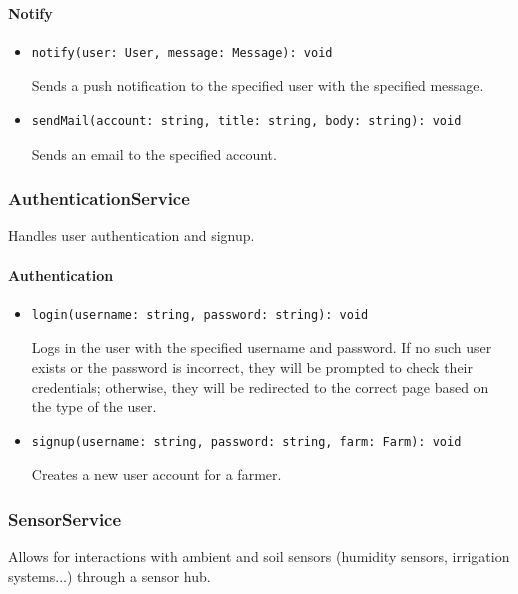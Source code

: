 \documentclass{article}
\begin{document}
\paragraph{Notify}
\begin{itemize}
\item \begin{verbatim}
notify(user: User, message: Message): void
\end{verbatim}
Sends a push notification to the specified user with the specified message.
\item \begin{verbatim}
sendMail(account: string, title: string, body: string): void
\end{verbatim}
Sends an email to the specified account.
\end{itemize}

\subsubsection{AuthenticationService}
Handles user authentication and signup.

\paragraph{Authentication}
\begin{itemize}
\item \begin{verbatim}
login(username: string, password: string): void
\end{verbatim}
Logs in the user with the specified username and password.
If no such user exists or the password is incorrect, they will be prompted to check their credentials; otherwise, they will be redirected to the correct page based on the type of the user.
\item \begin{verbatim}
signup(username: string, password: string, farm: Farm): void
\end{verbatim}
Creates a new user account for a farmer.
\end{itemize}

\subsubsection{SensorService}
Allows for interactions with ambient and soil sensors (humidity sensors, irrigation systems...) through a sensor hub.
\end{document}
